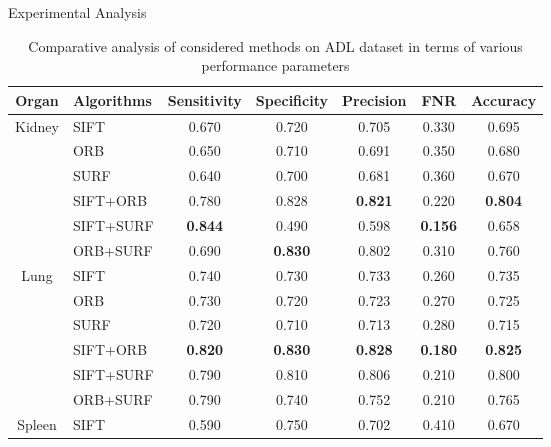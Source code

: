\documentclass [9pt,times] {beamer}
\begin{document}
\begin{frame}{Experimental Analysis}

\begin{table}
\renewcommand{\arraystretch}{1.1}
    \centering
    
    
    \caption[Comparative analysis of considered methods on ADL dataset in terms of various performance parameters]{{\scriptsize Comparative analysis of considered methods on ADL dataset in terms of various performance parameters}}
    
    \label{tab:adlpm}
    \scriptsize
    \begin{tabular}{|c|l|c|c|c|c|c|}
\hline
\textbf{Organ }    &    \textbf{Algorithms}    &    \textbf{Sensitivity}    &    \textbf{Specificity}    &    \textbf{Precision    }&    \textbf{FNR}    &    \textbf{Accuracy}    \\
\hline
Kidney    &    SIFT    &    0.670    &    0.720    &    0.705    &    0.330    &    0.695    \\
    &    ORB    &    0.650    &    0.710    &    0.691    &    0.350    &    0.680    \\
    &    SURF    &    0.640    &    0.700    &    0.681    &    0.360    &    0.670    \\
    &    SIFT+ORB    &    0.780    &    0.828    &\textbf{    0.821    }&    0.220    &\textbf{    0.804    }\\
    &    SIFT+SURF    &\textbf{    0.844    }&    0.490    &    0.598    &\textbf{    0.156    }&    0.658    \\
    &    ORB+SURF    &    0.690    &\textbf{    0.830    }&    0.802    &    0.310    &    0.760    \\
\hline
Lung    &    SIFT    &    0.740    &    0.730    &    0.733    &    0.260    &    0.735    \\
    &    ORB    &    0.730    &    0.720    &    0.723    &    0.270    &    0.725    \\
    &    SURF    &    0.720    &    0.710    &    0.713    &    0.280    &    0.715    \\
    &    SIFT+ORB    &\textbf{    0.820    }&\textbf{    0.830    }&\textbf{    0.828    }&\textbf{    0.180    }&\textbf{    0.825    }\\
    &    SIFT+SURF    &    0.790    &    0.810    &    0.806    &    0.210    &    0.800    \\
    &    ORB+SURF    &    0.790    &    0.740    &    0.752    &    0.210    &    0.765    \\
\hline
Spleen    &    SIFT    &    0.590    &    0.750    &    0.702    &    0.410    &    0.670    \\

\end{tabular}
\end{table}
\end{frame}
\end{document}
